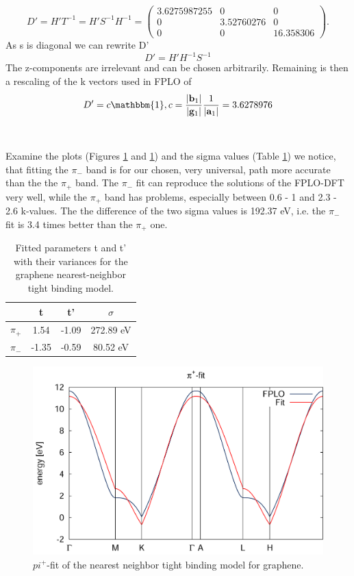		\begin{equation}
			D' = H' T^{-1} = H' S^{-1} H^{-1} = 
			\begin{pmatrix}
				3.6275987255 & 0 & 0 \\
				0 & 3.52760276 & 0 \\
				0 & 0 & 16.358306
			\end{pmatrix}.
		\end{equation}
		As s is diagonal we can rewrite D'
		\begin{equation}
			D'= H'H^{-1} S^{-1}
		\end{equation}
		The z-components are irrelevant and can be chosen arbitrarily. Remaining is then a rescaling of the k vectors used in FPLO of
		\begin{equation}
			D' = c \mathbbm{1}, c = \frac{|\vec b_1|}{|\vec g_1|} \frac{1}{| \vec a_1 |} = 3.6278976
		\end{equation}
		\\\\
		Examine the plots (Figures \ref{fig:piPlusFit} and \ref{fig:piPlusFit}) and the sigma values (Table \ref{table:tightBindingFit}) we notice, that fitting the $\pi_-$ band is for our chosen, very universal, path more accurate than the the $\pi_+$ band. The $\pi_-$ fit can reproduce the solutions of the FPLO-DFT very well, while the $\pi_+$ band has problems, especially between 0.6 - 1 and 2.3 - 2.6 k-values. The the difference of the two sigma values is 192.37 eV, i.e. the $\pi_-$ fit is 3.4 times better than the $\pi_+$ one.
		\begin{table}[h]
			\centering
			\begin{tabular}{cccc}
			     & t & t' & $\sigma$ \\
				\midrule
				 $\pi_+$ & 1.54 & -1.09 & 272.89 eV \\
				 $\pi_-$ & -1.35 & -0.59 & 80.52 eV\\
				\bottomrule
			\end{tabular}
			\caption{Fitted parameters t and t' with their variances for the graphene nearest-neighbor tight binding model.}
			\label{table:tightBindingFit}
		\end{table}
		\begin{figure}[h]
			\centering
			\includegraphics[width=1\textwidth]{Results/Figures/piPlusFit.png}
			\caption{$pi^+$-fit of the nearest neighbor tight binding model for graphene.}
			\label{fig:piPlusFit}
		\end{figure}
